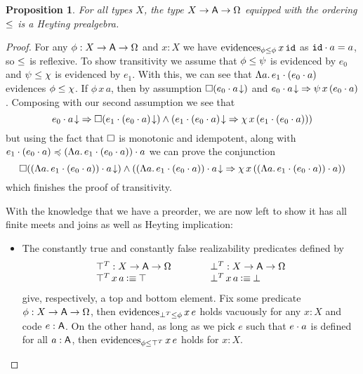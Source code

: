 \documentclass[11pt]{article}
\newtheorem{prop}[thrm]{Proposition}
\begin{document}
\begin{prop}
  For all types \(X\), the type \({{X}\to{{{\ensuremath{\mathsf{A}}}\to{\Omega}}}}\) equipped with the
  ordering \(\leq\) is a Heyting prealgebra.
\end{prop}
\begin{proof}
  For any \(\phi : {{X}\to{{{\ensuremath{\mathsf{A}}}\to{\Omega}}}}\) and \(x:X\) we have
  \(\text{evidences}_{{\phi}\leq{\phi}}\,x\,\texttt{id}\) as \({\texttt{id}}\cdot{a}=a\),
  so \(\leq\) is reflexive.
  To show transitivity we assume that \({\phi}\leq{\psi}\) is evidenced
  by \(e_{0}\) and \({\psi}\leq{\chi}\) is evidenced by \(e_{1}\).
  With this, we can see that \(\Lambda{a}.\,{{e_{1}}\cdot{({e_{0}}\cdot{a})}}\)
  evidences \({\phi}\leq{\chi}\).
  If \(\phi\,x\,a\), then by assumption \(\Box{({{{e_{0}}\cdot{a}}\!\downarrow})}\)
  and \({{{{e_{0}}\cdot{a}}\!\downarrow}}\Rightarrow{\psi\,x\,({e_{0}}\cdot{a})}\).
  Composing with our second assumption we see that
  \[
    \IImplies%
    {\ITotal{\IAp{e_{0}}{a}}}%
    {\IAnd%
      {\IBox{(\ITotal{\IAp{e_{1}}{(\IAp{e_{0}}{a})}})}}%
      {(\IImplies%
        {\ITotal{\IAp{e_{1}}{(\IAp{e_{0}}{a})}}}%
        {\chi\,x\,(\IAp{e_{1}}{(\IAp{e_{0}}{a})})})%
      }%
    }
  \]
  but using the fact that \(\Box\) is monotonic and idempotent, along with
  \({{e_{1}}\cdot{({e_{0}}\cdot{a})}}\preccurlyeq{{(\Lambda{a}.\,{{e_{1}}\cdot{({e_{0}}\cdot{a})}})}\cdot{a}}\)
  we can prove the conjunction
  \[
    \IAnd%
    {\IBox{(\ITotal{\IAp{(\IAbs{a}{\IPAp{e_{1}}{(\IPAp{e_{0}}{a})}})}{a}})}}%
    {(\IImplies%
      {\ITotal{\IAp{(\IAbs{a}{\IPAp{e_{1}}{(\IPAp{e_{0}}{a})}})}{a}}}%
      {\chi\,x\,(\IAp{(\IAbs{a}{\IPAp{e_{1}}{(\IPAp{e_{0}}{a})}})}{a})})%
    }
  \]
  which finishes the proof of transitivity.

  With the knowledge that we have a preorder, we are now left to show
  it has all finite meets and joins as well as Heyting implication:
  \begin{itemize}
    \item The constantly true and constantly false realizability predicates
      defined by
      \[\begin{array}{lll}
          \top^{T} : {{X}\to{{{\ensuremath{\mathsf{A}}}\to{\Omega}}}} &\qquad& \bot^{T} : {{X}\to{{{\ensuremath{\mathsf{A}}}\to{\Omega}}}}\\
          {\top^{T}\,x\,a}\mathbin{\vcentcolon\equiv}{\top}&& {\bot^{T}\,x\,a}\mathbin{\vcentcolon\equiv}{\bot}
        \end{array}\]
      give, respectively, a top and bottom element.
      Fix some predicate \(\phi : {{X}\to{{{\ensuremath{\mathsf{A}}}\to{\Omega}}}}\), then
      \(\text{evidences}_{{\bot^{T}}\leq{\phi}}\,x\,e\) holds vacuously for any \(x : X\) and
      code \(e : \mathsf{A}\).
      On the other hand, as long as we pick \(e\) such that \({e}\cdot{a}\) is
      defined for all \(a:\mathsf{A}\), then \(\text{evidences}_{{\phi}\leq{\top^{T}}}\,x\,e\) holds
      for \(x :X\).


\end{itemize}
\end{proof}
\end{document}
